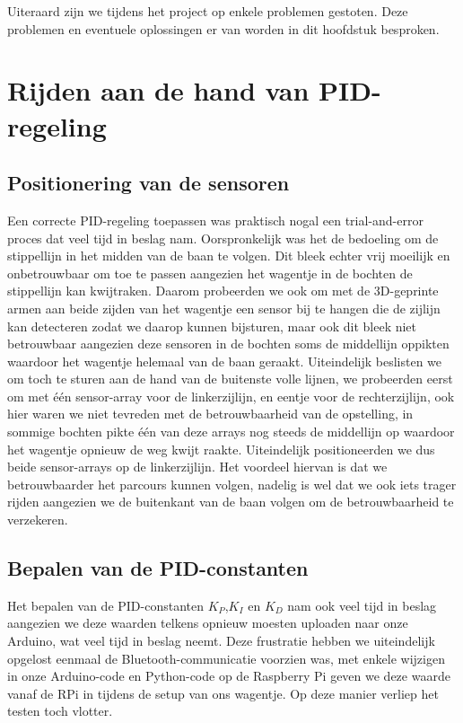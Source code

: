 Uiteraard zijn we tijdens het project op enkele problemen gestoten. Deze problemen en eventuele oplossingen er van worden in dit hoofdstuk besproken.

\section{Rijden aan de hand van PID-regeling}
\subsection{Positionering van de sensoren}
Een correcte PID-regeling toepassen was praktisch nogal een trial-and-error proces dat veel tijd in beslag nam. Oorspronkelijk was het de bedoeling om de stippellijn in het midden van de baan te volgen. Dit bleek echter vrij moeilijk en onbetrouwbaar om toe te passen aangezien het wagentje in de bochten de stippellijn kan kwijtraken. Daarom probeerden we ook om met de 3D-geprinte armen aan beide zijden van het wagentje een sensor bij te hangen die de zijlijn kan detecteren zodat we daarop kunnen bijsturen, maar ook dit bleek niet betrouwbaar aangezien deze sensoren in de bochten soms de middellijn oppikten waardoor het wagentje helemaal van de baan geraakt. Uiteindelijk beslisten we om toch te sturen aan de hand van de buitenste volle lijnen, we probeerden eerst om met \'e\'en sensor-array voor de linkerzijlijn, en eentje voor de rechterzijlijn, ook hier waren we niet tevreden met de betrouwbaarheid van de opstelling, in sommige bochten pikte \'e\'en van deze arrays nog steeds de middellijn op waardoor het wagentje opnieuw de weg kwijt raakte. Uiteindelijk positioneerden we dus beide sensor-arrays op de linkerzijlijn. Het voordeel hiervan is dat we betrouwbaarder het parcours kunnen volgen, nadelig is wel dat we ook iets trager rijden aangezien we de buitenkant van de baan volgen om de betrouwbaarheid te verzekeren.
\subsection{Bepalen van de PID-constanten}
Het bepalen van de PID-constanten $K_P$,$K_I$ en $K_D$ nam ook veel tijd in beslag aangezien we deze waarden telkens opnieuw moesten uploaden naar onze Arduino, wat veel tijd in beslag neemt. Deze frustratie hebben we uiteindelijk opgelost eenmaal de Bluetooth-communicatie voorzien was, met enkele wijzigen in onze Arduino-code en Python-code op de Raspberry Pi geven we deze waarde vanaf de RPi in tijdens de setup van ons wagentje. Op deze manier verliep het testen toch vlotter.

